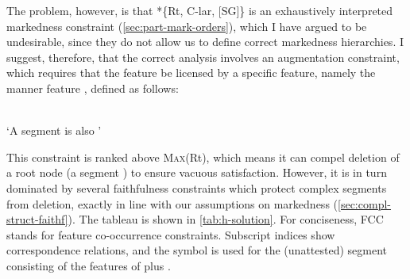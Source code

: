 The problem, however, is that *\{Rt, C-lar, [SG]\} is an exhaustively interpreted markedness constraint (\cref{sec:part-mark-orders}), which I have argued to be undesirable, since they do not allow us to define correct markedness hierarchies. I suggest, therefore, that the correct analysis involves an augmentation constraint, which requires that the feature  be licensed by a specific feature, namely the manner feature , defined as follows:

\begin{constraint}
  \label{def:have-cl-sg} \\
  `A  segment is also '
\end{constraint}


This constraint is ranked above \textsc{Max}(Rt), which means it can compel deletion of a root node (\ie a segment \ipa{[h]}) to ensure vacuous satisfaction. However, it is in turn dominated by several faithfulness constraints which protect complex segments from deletion, exactly in line with our assumptions on markedness (\cref{sec:compl-struct-faithf}). The tableau is shown in \cref{tab:h-solution}. For conciseness, \textsc{FCC} stands for feature co\hyp occurrence constraints. Subscript indices show correspondence relations, and the symbol \ipa{[tɬ]} is used for the (unattested) segment consisting of the features of \ipa{[ɬ]} plus .

